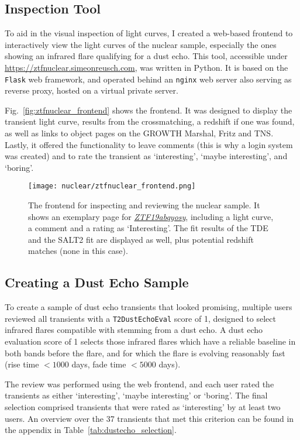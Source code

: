 \subsection{Inspection Tool}
To aid in the visual inspection of light curves, I created a web-based frontend to interactively view the light curves of the nuclear sample, especially the ones showing an infrared flare qualifying for a dust echo. This tool, accessible under \url{https://ztfnuclear.simeonreusch.com}, was written in Python. It is based on the \texttt{Flask} web framework, and operated behind an \texttt{nginx} web server also serving as reverse proxy, hosted on a virtual private server.

Fig.~\ref{fig:ztfnuclear_frontend} shows the frontend. It was designed to display the transient light curve, results from the crossmatching, a redshift if one was found, as well as links to object pages on the GROWTH Marshal, Fritz and TNS. Lastly, it offered the functionality to leave comments (this is why a login system was created) and to rate the transient as `interesting', `maybe interesting', and `boring'.

\begin{figure}[htb]
  \texttt{[image: nuclear/ztfnuclear\_frontend.png]}
  \caption[Frontend for the nuclear sample]{The frontend for inspecting and reviewing the nuclear sample. It shows an exemplary page for \textit{\href{https://ztfnuclear.simeonreusch.com/transient/ZTF19abqyosy}{ZTF19abqyosy}}, including a light curve, a comment and a rating as `Interesting'. The fit results of the TDE and the SALT2 fit are displayed as well, plus potential redshift matches (none in this case).}
\end{figure}

\subsection{Creating a Dust Echo Sample}
To create a sample of dust echo transients that looked promising, multiple users reviewed all transients with a \texttt{T2DustEchoEval} score of 1, designed to select infrared flares compatible with stemming from a dust echo. A dust echo evaluation score of 1 selects those infrared flares which have a reliable baseline in both bands before the flare, and for which the flare is evolving reasonably fast (rise time $<1000$ days, fade time $<5000$ days).

The review was performed using the web frontend, and each user rated the transients as either `interesting', `maybe interesting' or `boring'. The final selection comprised transients that were rated as `interesting' by at least two users. An overview over the 37 transients that met this criterion can be found in the appendix in Table~\ref{tab:dustecho_selection}.

